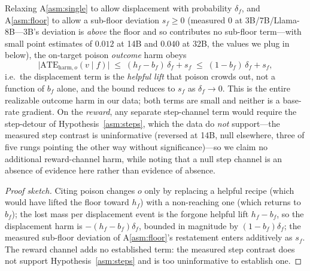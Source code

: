 \begin{proposition}\label{prop:poison}
Relaxing A\ref{asm:single} to allow displacement with probability $\delta_f$, and
A\ref{asm:floor} to allow a sub-floor deviation $s_f\ge0$ (measured $0$ at
3B/7B/Llama-8B---3B's deviation is \emph{above} the floor and so contributes no sub-floor
term---with small point estimates of $0.012$ at 14B and $0.040$ at 32B, the values we plug
in below), the on-target poison \emph{outcome} harm obeys
\[
\bigl|\mathrm{ATE}_{\mathrm{harm},o}(v\mid f)\bigr|\;\le\;(h_f-b_f)\,\delta_f + s_f
\;\le\;(1-b_f)\,\delta_f + s_f ,
\]
i.e.\ the displacement term is the \emph{helpful lift} that poison crowds out, not a
function of $b_f$ alone, and the bound reduces to $s_f$ as $\delta_f\to0$. This is the
entire realizable outcome harm in our
data; both terms are small and neither is a base-rate gradient. On the \emph{reward}, any
separate step-channel term would require the step-detour of Hypothesis~\ref{asm:steps},
which the data do \emph{not} support---the measured step contrast is uninformative
(reversed at 14B, null elsewhere, three of five rungs pointing the other way without
significance)---so we claim no additional reward-channel harm, while noting that a null
step channel is an absence of evidence here rather than evidence of absence.
\end{proposition}
\begin{proof}[Proof sketch]
Citing poison changes $o$ only by replacing a helpful recipe (which would have lifted
the floor toward $h_f$) with a non-reaching one (which returns to $b_f$); the lost
mass per displacement event is the forgone helpful lift $h_f-b_f$, so the displacement
harm is $-(h_f-b_f)\delta_f$, bounded in magnitude by $(1-b_f)\delta_f$; the measured
sub-floor deviation of A\ref{asm:floor}'s restatement enters additively as $s_f$. The
reward channel adds no established term: the measured step contrast does not support
Hypothesis~\ref{asm:steps} and is too uninformative to establish one. \end{proof}

